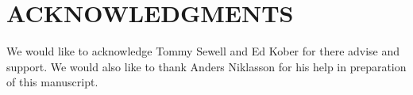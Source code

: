 \documentclass[prb,aps,nobibnotes,twocolumn,doublespace,twocolumngrid,superbib]{revtex4}
\begin{document}
\section*{ACKNOWLEDGMENTS}

We would like to acknowledge Tommy Sewell and Ed Kober for there advise
and support. We would also like to thank Anders Niklasson for his help
in preparation of this manuscript. 

 
 

%
%
%
%
%
%
%
%
%
%
%
%
%
%
%
%
%
%
%
%
%
\end{document}

